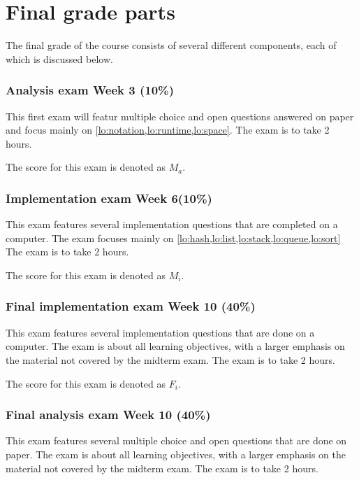 \section{Final grade parts}
\label{sec:final_grade_parts}

The final grade of the course consists of several different components, each of which is discussed below.

\subsubsection*{Analysis exam Week 3 (10\%)}
\label{ssub:mc_exam_week_3_10}

This first exam will featur multiple choice and open questions answered on paper and focus mainly on
\cref{lo:notation,lo:runtime,lo:space}. The exam is to take 2 hours.

The score for this exam is denoted as $M_a$.

\subsubsection*{Implementation exam Week 6(10\%)}

This exam features several implementation questions that are completed on a computer. The exam focuses mainly on
\cref{lo:hash,lo:list,lo:stack,lo:queue,lo:sort} The exam is to take 2 hours.

The score for this exam is denoted as $M_i$.

\subsubsection*{Final implementation exam Week 10 (40\%)}

This exam features several implementation questions that are done on a computer. The exam is about all learning
objectives, with a larger emphasis on the material not covered by the midterm exam. The exam is to take 2 hours.  

The score for this exam is denoted as $F_i$.

\subsubsection*{Final analysis exam Week 10 (40\%)}

This exam features several multiple choice and open questions that are done on paper. The exam is about all learning
objectives, with a larger emphasis on the material not covered by the midterm exam. The exam is to take 2 hours.  

